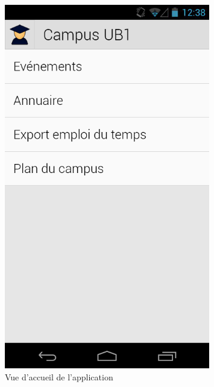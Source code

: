 \documentclass [pdftex,12pt] {report}
\begin{document}
\begin{figure}
\begin{minipage}[t]{8cm}
    \label{fig:01}
  \end{minipage}
  \hspace{+20pt}
  \begin{minipage}[t]{8cm}
    \centering
    \includegraphics[width=0.8\textwidth]{resources/ui_preview/02}
    \caption{Vue d'accueil de l'application}
    \label{fig:02}
  \end{minipage}
  \hspace{-60pt}
\end{figure}
\end{document}
